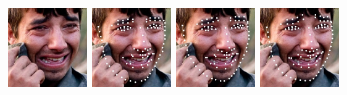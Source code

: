 \documentclass[journal,transmag]{IEEEtran}
\begin{document}
\begin{figure}[tbh]
   \centering
   \includegraphics[width=2.1cm]{visualization_imgs/raw_images/WFLW_test_579.jpg}
   \includegraphics[width=2.1cm]{visualization_imgs/hrnet_pred_images/pred_579.jpg}
   \includegraphics[width=2.1cm]{visualization_imgs/ATF_pred_images/pred_579.jpg}
   \includegraphics[width=2.1cm]{visualization_imgs/gt_images/WFLW_test_579.jpg}
   




\end{figure}
\end{document}
